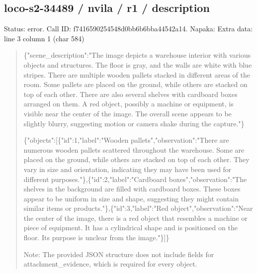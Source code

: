 \documentclass[10pt,a4paper]{article}
\begin{document}
\subsection*{loco-s2-34489 / nvila / r1 / description}
Status: error. Call ID: f7416590254548d0bb6b6bba44542a14. Napaka: Extra data: line 3 column 1 (char 584)
\begin{quote}\footnotesize
\{"scene\_description":\allowbreak{}"The image depicts a warehouse interior with various objects and structures. The floor is gray,\allowbreak{} and the walls are white with blue stripes. There are multiple wooden pallets stacked in different areas of the room. Some pallets are placed on the ground,\allowbreak{} while others are stacked on top of each other. There are also several shelves with cardboard boxes arranged on them. A red object,\allowbreak{} possibly a machine or equipment,\allowbreak{} is visible near the center of the image. The overall scene appears to be slightly blurry,\allowbreak{} suggesting motion or camera shake during the capture."\}\par
\par
\{"objects":\allowbreak{}[\{"id":\allowbreak{}1,\allowbreak{}"label":\allowbreak{}"Woo\allowbreak{}den pallets",\allowbreak{}"observation":\allowbreak{}"There are numerous wooden pallets scattered throughout the warehouse. Some are placed on the ground,\allowbreak{} while others are stacked on top of each other. They vary in size and orientation,\allowbreak{} indicating they may have been used for different purposes."\},\allowbreak{}\{"id":\allowbreak{}2,\allowbreak{}"label":\allowbreak{}"Car\allowbreak{}dboard boxes",\allowbreak{}"observation":\allowbreak{}"The shelves in the background are filled with cardboard boxes. These boxes appear to be uniform in size and shape,\allowbreak{} suggesting they might contain similar items or products."\},\allowbreak{}\{"id":\allowbreak{}3,\allowbreak{}"label":\allowbreak{}"Red\allowbreak{} object",\allowbreak{}"observation":\allowbreak{}"Near the center of the image,\allowbreak{} there is a red object that resembles a machine or piece of equipment. It has a cylindrical shape and is positioned on the floor. Its purpose is unclear from the image."\}]\}\par
\par
Note:\allowbreak{} The provided JSON structure does not include fields for attachment\_evidence,\allowbreak{} which is required for every object.
\end{quote}
\end{document}
